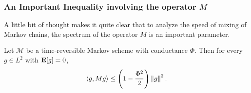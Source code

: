 
\subsubsection{An Important Inequality involving the operator \texorpdfstring{$M$}{M}}

A little bit of thought makes it quite clear that to analyze the speed of mixing of Markov chains, the spectrum of the operator $M$ is an important parameter.

\begin{ftheo}
\label{rapid mixing expec 0}
	Let $\mathcal{M}$ be a time-reversible Markov scheme with conductance $\Phi$. Then for every $g\in L^2$ with $\textbf{E}[g]=0$,
	\[ \langle g,Mg\rangle \leq \left(1-\frac{\Phi^2}{2}\right)\left\lVert g\right\rVert^2. \]
\end{ftheo}

